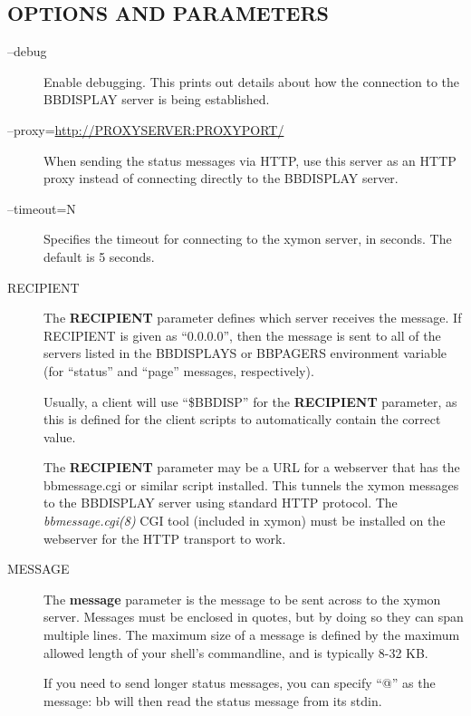 \subsection{OPTIONS AND PARAMETERS}
\begin{description}

\item[--debug] Enable debugging. This prints out details about how the
  connection to the BBDISPLAY server is being established. 

\item[--proxy=\url{http://PROXYSERVER:PROXYPORT/}] When sending the
  status messages via HTTP, use this server as an HTTP proxy instead
  of connecting directly to the BBDISPLAY server. 

\item[--timeout=N] Specifies the timeout for connecting to the xymon
  server, in seconds. The default is 5 seconds. 

\item[RECIPIENT] The \textbf{RECIPIENT}
 parameter defines which server receives the message. If RECIPIENT is
 given as ``0.0.0.0'', then the message is sent to all of the servers
 listed in the BBDISPLAYS or BBPAGERS environment variable (for
 ``status'' and ``page'' messages, respectively). 

Usually, a client will use ``\$BBDISP'' for the \textbf{RECIPIENT}
parameter, as this is defined for the client scripts to automatically
contain the correct value. 


The \textbf{RECIPIENT} parameter may be a URL for a webserver that
has the bbmessage.cgi or similar script installed. This tunnels the
xymon messages to the BBDISPLAY server using standard HTTP
protocol. The \emph{bbmessage.cgi(8)} CGI tool (included in xymon)
must be installed on the webserver for the HTTP transport to work.  


\item[MESSAGE] The \textbf{message} parameter is the message to be
  sent across to the xymon server. Messages must be enclosed in
  quotes, but by doing so they can span multiple lines. The maximum
  size of a message is defined by the maximum allowed length of your
  shell's commandline, and is typically  8-32 KB. 

If you need to send longer status messages, you can specify ``@'' as
the message: bb will then read the status message from its stdin. 


\end{description}

